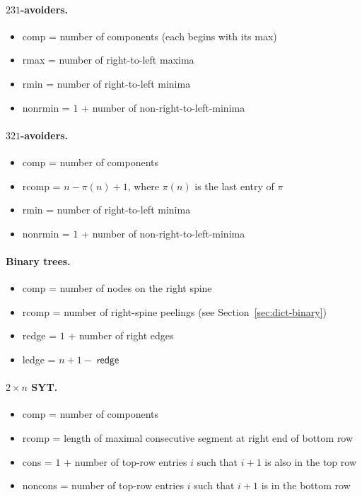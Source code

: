 \documentclass[a4paper,11pt]{article}
\theoremstyle{definition}
\DeclareMathOperator{\redge}{\mathsf{redge}}
\begin{document}
\paragraph{$231$-avoiders.}
\begin{itemize}
\item comp = number of components (each begins
  with its max)
\item rmax = number of right-to-left maxima
\item rmin = number of right-to-left minima
\item nonrmin = $1$ + number of non-right-to-left-minima
\end{itemize}

\paragraph{$321$-avoiders.}
\begin{itemize}
\item comp = number of components
\item rcomp = $n - \pi(n) + 1$, where $\pi(n)$ is the last entry of $\pi$
\item rmin = number of right-to-left minima
\item nonrmin = $1$ + number of non-right-to-left-minima
\end{itemize}

\paragraph{Binary trees.}
\begin{itemize}
\item comp = number of nodes on the right spine
\item rcomp = number of right-spine peelings
  (see Section~\ref{sec:dict-binary})
\item redge = $1$ + number of right edges
\item ledge = $n + 1 - \redge$
\end{itemize}

\paragraph{$2 \times n$ SYT.}
\begin{itemize}
\item comp = number of components
\item rcomp = length of maximal consecutive segment at
  right end of bottom row
\item cons = $1$ + number of top-row entries $i$ such that
  $i{+}1$ is also in the top row
\item noncons = number of top-row entries $i$ such that
  $i{+}1$ is in the bottom row
\end{itemize}
\end{document}

